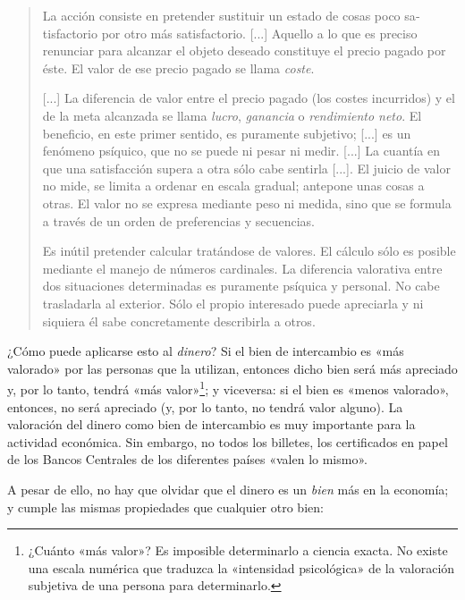 \documentclass[12pt,a4paper,twoside]{book}
\begin{document}
\begin{quotation}
La acción consiste en pretender sustituir un estado de cosas poco sa­tisfactorio por otro más satisfactorio. [...] Aquello a lo que es preciso renunciar para alcanzar el objeto deseado constituye el pre­cio pagado por éste. El valor de ese precio pagado se llama \textit{coste}.

[...] La diferencia de valor entre el precio pagado (los costes incurridos) y el de la meta alcanzada se llama \textit{lucro}, \textit{ganancia} o \textit{rendimiento neto}. El beneficio, en este primer sentido, es puramente subjetivo; [...] es un fenómeno psíquico, que no se puede ni pesar ni medir. [...] La cuan­tía en que una satisfacción supera a otra sólo cabe sentirla [...]. El juicio de valor no mide, se limita a ordenar en escala gra­dual; antepone unas cosas a otras. El valor no se expresa mediante peso ni medida, sino que se formula a través de un orden de preferencias y secuencias.

Es inútil pretender calcular tratándose de valores. El cálculo sólo es posible mediante el manejo de números cardinales. La diferencia valorativa entre dos situaciones determinadas es puramente psíquica y personal. No cabe trasladarla al exterior. Sólo el propio interesado puede apreciarla y ni siquiera él sabe concretamente describirla a otros. \cite[pág. 117]{mises:lah}
\end{quotation}

¿Cómo puede aplicarse esto al \textit{dinero}? Si el bien de intercambio es «más valorado» por las personas que la utilizan, entonces dicho bien será más apreciado y, por lo tanto, tendrá «más valor»\footnote{¿Cuánto «más valor»? Es imposible determinarlo a ciencia exacta. No existe una escala numérica que traduzca la «intensidad psicológica» de la valoración subjetiva de una persona para determinarlo.}; y viceversa: si el bien es «menos valorado», entonces, no será apreciado (y, por lo tanto, no tendrá valor alguno). La valoración del dinero como bien de intercambio es muy importante para la actividad económica. Sin embargo, no todos los billetes, los certificados en papel de los Bancos Centrales de los diferentes países «valen lo mismo».

A pesar de ello, no hay que olvidar que el dinero es un \textit{bien} más en la economía; y cumple las mismas propiedades que cualquier otro bien:
\end{document}
